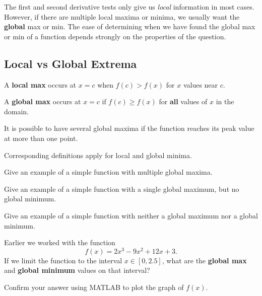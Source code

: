 The first and second derivative tests only give us {\em local}
information in most cases.  However, if there are multiple local
maxima or minima, we usually want the {\bf global} max or min.  The
ease of determining when we have found the global max or min of a
function depends strongly on the properties of the question.

\begin{boxnote}

  \subsection*{Local vs Global Extrema}

  A {\bf local max} occurs at $x=c$ when $f(c) > f(x)$ for $x$ values
  near $c$.

  A {\bf global max} occurs at $x=c$ if $f(c) \ge f(x)$ for {\bf all}
  values of $x$ in the domain.  

  It is possible to have several global maxima if the function reaches
  its peak value at more than one point.

  Corresponding definitions apply for local and global minima.

\end{boxnote}

\newpage

\problem Give an example of a simple function with multiple global
  maxima.

\vfill

\problem Give an example of a simple function with a single global
  maximum, but no global minimum.

\vfill

\problem Give an example of a simple function with neither a global
  maximum nor a global minimum.

\vfill


\newpage Earlier we worked with the function $$f(x) = 2 x^3 -
  9 x^2 + 12 x +3.$$  
\problem If we limit the function to the interval $x \in
  [0, 2.5]$, what are the {\bf global max} and {\bf global minimum}
  values on that interval?  



\vfill
\vfill

Confirm your answer using MATLAB to plot the graph of $f(x)$.

\newpage


